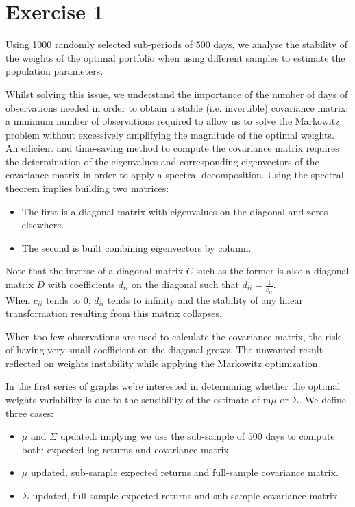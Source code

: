 
\chapter*{Exercise 1}

Using 1000 randomly selected sub-periods of 500 days, we analyse the stability of the weights of the optimal portfolio when using different samples to estimate the population parameters.\par \smallskip

Whilst solving this issue, we understand the importance of the number of days of observations needed in order to obtain a stable (i.e. invertible) covariance matrix: a minimum number of observations required to allow us to solve the Markowitz problem without excessively amplifying the magnitude of the optimal weights. \\
An efficient and time-saving method to compute the covariance matrix requires the determination of the eigenvalues and corresponding eigenvectors of the covariance matrix in order to apply a spectral decomposition. Using the spectral theorem implies building two matrices:

\begin{itemize}
    \item The first is a diagonal matrix with eigenvalues on the diagonal and zeros elsewhere.
    \item The second is built combining eigenvectors by column.
\end{itemize}
Note that the inverse of a diagonal matrix $ C $ such as the former is also a diagonal matrix $ D $ with coefficients $ d_{ii} $ on the diagonal such that \(d_{ii}=\frac{1}{c_{ii}}\). \\
When $ c_{ii} $ tends to $ 0 $, $ d_{ii} $ tends to infinity and the stability of any linear transformation resulting from this matrix collapses.
\par\smallskip

When too few observations are used to calculate the covariance matrix, the risk of having very small coefficient on the diagonal grows. The unwanted result reflected on weights instability while applying the Markowitz optimization.
\par\smallskip
In the first series of graphs we’re interested in determining whether the optimal weights variability is due to the sensibility of the estimate of m$\mu$ or $\Sigma$. We define three cases:

\begin{itemize}
\item $\mu$ and $\Sigma$ updated: implying we use the sub-sample of 500 days to compute both: expected log-returns and covariance matrix.
\item $\mu$ updated, sub-sample expected returns and full-sample covariance matrix.
\item $\Sigma$ updated, full-sample expected returns and sub-sample covariance matrix.
\end{itemize}

